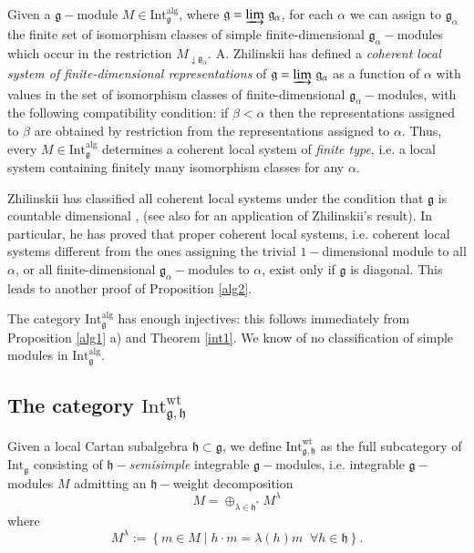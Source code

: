 \documentclass{svmult}
\newcommand{\wt}{\mathrm{wt}}
\newcommand{\hh}{\mathfrak{h}}
\renewcommand{\gg}{\mathfrak{g}}
\newcommand{\Int}{\mathrm{Int}}
\newcommand{\alg}{\mathrm{alg}}
\begin{document}
Given a $\gg-$module $M \in \Int_{\gg}^\alg$, where $\gg = \varinjlim\,\gg_{\alpha}$, for each $\alpha$ we can assign to $\gg_{\alpha}$ the finite set of isomorphism classes of simple finite-dimensional $\gg_{\alpha}-$modules which occur in the restriction $M_{\downarrow\gg_{\alpha}}$. A. Zhilinskii has defined a \textit{coherent local system of finite-dimensional representations} of $\gg = \varinjlim\,\gg_{\alpha}$ as a function of $\alpha$ with values in the set of isomorphism classes of finite-dimensional $\gg_{\alpha}-$modules, with the following compatibility condition: if $\beta < \alpha$ then the representations assigned to $\beta$ are obtained by restriction from the representations assigned to $\alpha$. Thus, every $M \in \Int_{\gg}^\alg$ determines a coherent local system of \textit{finite type}, i.e. a local system containing finitely many isomorphism classes for any $\alpha$.

Zhilinskii has classified all coherent local systems under the condition that $\gg$ is countable dimensional \cite{Zh1}, \cite{Zh2} (see also  \cite{PP} for an application of Zhilinskii's result). In particular, he has proved that proper coherent local systems, i.e. coherent local systems different from the ones assigning the trivial $1-$dimensional module to all $\alpha$, or all finite-dimensional $\gg_{\alpha}-$modules to $\alpha$, exist only if $\gg$ is diagonal. This leads to another proof of Proposition \ref{alg2}.

The category  $\mathrm{Int}_{\gg}^\alg$ has enough injectives: this follows immediately from Proposition \ref{alg1} a) and Theorem \ref{int1}.
We know of no classification of simple modules in $\Int_{\gg}^\alg$.

\subsection {The category  $\mathrm{Int}^{\wt}_{\gg,\hh}$}\label{sect:3.2}
Given a local Cartan subalgebra $\hh \subset \gg$, we define 
$\mathrm{Int}^{\wt}_{\gg,\hh}$ as the full subcategory of $\mathrm{Int}_{\gg}$ 
consisting of \textit{$\hh-$semisimple} integrable $\gg-$modules, i.e. integrable $\gg-$modules $M$ admitting an $\hh-$weight decomposition
\begin{equation}\label{M_weight_dec}
 M = \oplus_{\lambda \in \hh^*} M^{\lambda}
\end{equation}
where 
\begin{equation}\label{eq.6}
M^{\lambda} := \left\lbrace m \in M\; |\; h \cdot m = \lambda(h)m\;\; \forall h \in \hh\right\rbrace. \nonumber
\end{equation}
\end{document}
